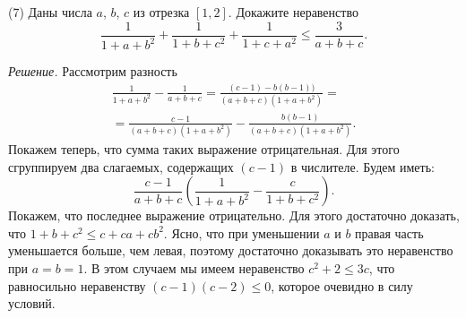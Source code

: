 \textsf{(7)}
Даны числа $a$, $b$, $c$ из отрезка $[1,2]$.
Докажите неравенство
\[
    \frac{1}{1 + a + b^2}
    +
    \frac{1}{1 + b + c^2}
    +
    \frac{1}{1 + c + a^2}
\leq
    \frac{3}{a + b + c}
.\]

\solution
\emph{Решение.}
Рассмотрим разность 
\begin{gather*}
    \frac{1}{1 + a + b^2} - \frac{1}{a + b + c}
=
    \frac{(c - 1) - b (b - 1))}{(a + b + c)(1 + a + b^2)}
=\\=
    \frac{c - 1}{(a + b + c)(1 + a + b^2)}
    -
    \frac{b (b - 1)}{(a + b + c)(1 + a + b^2)}
.\end{gather*}
Покажем теперь, что сумма таких выражение отрицательная.
Для этого сгруппируем два слагаемых, содержащих $(c - 1)$ в числителе.
Будем иметь:
\[
    \frac{c - 1}{a + b + c}
    \left(
        \frac{1}{1 + a + b^2}
        -
        \frac{c}{1 + b + c^2}
    \right)
.\]
Покажем, что последнее выражение отрицательно.
Для этого достаточно доказать, что $1 + b + c^2 \leq c + c a + c b^2$.
Ясно, что при уменьшении $a$ и $b$ правая часть уменьшается больше, чем левая,
поэтому достаточно доказывать это неравенство при $a = b = 1$.
В этом случаем мы имеем неравенство $c^2 + 2 \leq 3 c$, что равносильно
неравенству $(c - 1) (c - 2) \leq 0$, которое очевидно в силу условий.

